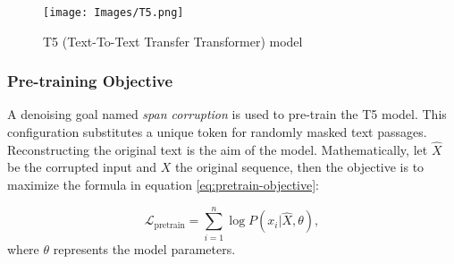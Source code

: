 \documentclass{dhbenelux}
\begin{document}
\begin{figure}[h]
\centering
\texttt{[image: Images/T5.png]}
\caption{T5 (Text-To-Text Transfer Transformer) model}
\label{fig:t5-model}
\end{figure}

\subsubsection{Pre-training Objective}
A denoising goal named \textit{span corruption} is used to pre-train the T5 model. This configuration substitutes a unique token for randomly masked text passages. Reconstructing the original text is the aim of the model. Mathematically, let \( \hat{X} \) be the corrupted input and \( X \) the original sequence, then the objective is to maximize the formula in equation \ref{eq:pretrain-objective}:

\begin{equation}
\mathcal{L}_{\text{pretrain}} = \sum_{i=1}^n \log P(x_i | \hat{X}, \theta),
\label{eq:pretrain-objective}
\end{equation}
where \( \theta \) represents the model parameters.
\end{document}
